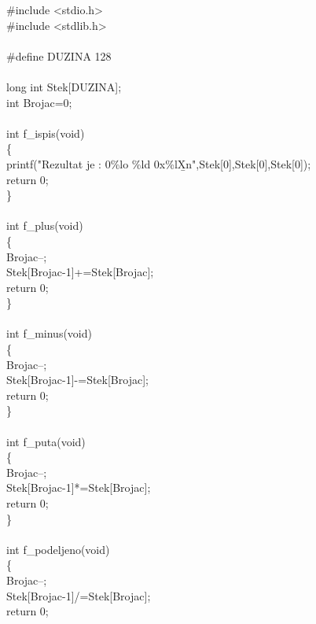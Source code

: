      {
        \#include <stdio.h>\\
        \#include <stdlib.h>\\
        \\
        \#define DUZINA 128\\
        \\
        long int Stek[DUZINA];\\
        int Brojac=0;\\
        \\
        int f\_ispis(void)\\
        \{\\
        {\s\s}printf("Rezultat je : 0\%lo \%ld 0x\%lX{\b}n",Stek[0],Stek[0],Stek[0]);\\
        {\s\s}return 0;\\
        \}\\
        \\
        int f\_plus(void)\\
        \{\\
        {\s\s}Brojac--;\\
        {\s\s}Stek[Brojac-1]+=Stek[Brojac];\\
        {\s\s}return 0;\\
        \}\\
        \\
        int f\_minus(void)\\
        \{\\
        {\s\s}Brojac--;\\
        {\s\s}Stek[Brojac-1]-=Stek[Brojac];\\
        {\s\s}return 0;\\
        \}\\
        \\
        int f\_puta(void)\\
        \{\\
        {\s\s}Brojac--;\\
        {\s\s}Stek[Brojac-1]*=Stek[Brojac];\\
        {\s\s}return 0;\\
        \}\\
        \\
        int f\_podeljeno(void)\\
        \{\\
        {\s\s}Brojac--;\\
        {\s\s}Stek[Brojac-1]/=Stek[Brojac];\\
        {\s\s}return 0;\\
}
